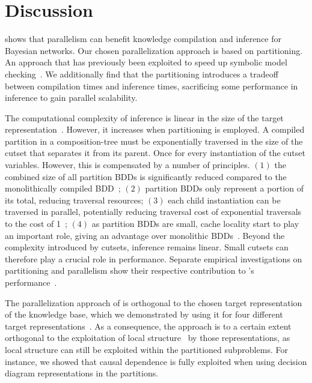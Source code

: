 
\section{Discussion}
\label{sec:conclusion}

\toolname shows that parallelism can benefit knowledge compilation and inference for Bayesian networks. Our chosen parallelization approach is based on partitioning. An approach that has previously been exploited to speed up symbolic model checking~\cite{sylvan-journal,narayan1996partitioned,sahoo2004partitioning}.  We additionally find that the partitioning introduces a tradeoff between compilation times and inference times, sacrificing some performance in inference to gain parallel scalability.

The computational complexity of inference is linear in the size of the target representation~\cite{darwiche2002knowledge}. However, it increases when partitioning is employed. A compiled partition in a composition-tree must be exponentially traversed in the size of the cutset that separates it from its parent. Once for every instantiation of the cutset variables. However, this is compensated by a number of principles. $(1)$ the combined size of all partition BDDs is significantly reduced compared to the monolithically compiled BDD~\cite{dal2017reducing}; $(2)$ partition BDDs only represent a portion of its total, reducing traversal resources; $(3)$ each child instantiation can be traversed in parallel, potentially reducing traversal cost of exponential traversals to the cost of 1~\cite{dal2021compositional}; $(4)$ as partition BDDs are small, cache locality start to play an important role, giving an advantage over monolithic BDDs~\cite{dal2018parallel}. Beyond the complexity introduced by cutsets, inference remains linear. Small cutsets can therefore play a crucial role in performance. Separate empirical investigations on partitioning and parallelism show their respective contribution to \toolname's performance~\cite{dal2018parallel,dal2021compositional}.

The parallelization approach of \toolname is orthogonal to the chosen target representation of the knowledge base, which we demonstrated by using it for four different target representations~\cite{dal2018parallel}. As a consequence, the approach is to a certain extent orthogonal to the exploitation of local structure~\cite{shih2019compiling} by those representations, as local structure can still be exploited within the partitioned subproblems. For instance, we showed that causal dependence is fully exploited when using decision diagram representations in the partitions.

